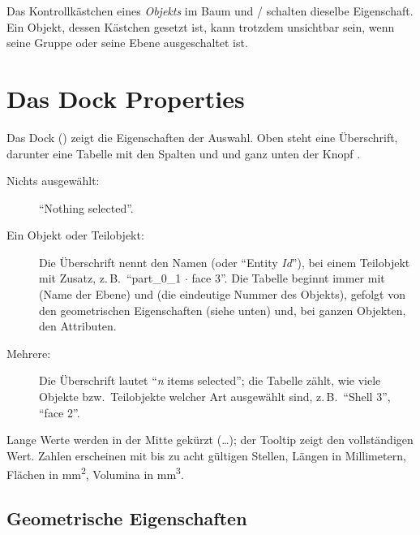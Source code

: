 \begin{hinweis}
Das Kontrollkästchen eines \emph{Objekts} im Baum und / schalten
dieselbe Eigenschaft. Ein Objekt, dessen Kästchen gesetzt ist, kann trotzdem unsichtbar sein,
wenn seine Gruppe oder seine Ebene ausgeschaltet ist.
\end{hinweis}

\section{Das Dock Properties}\label{sec:eigenschaften}

Das Dock  () zeigt die Eigenschaften der Auswahl. Oben
steht eine Überschrift, darunter eine Tabelle mit den Spalten  und 
und ganz unten der Knopf .

\begin{description}
  \item[Nichts ausgewählt:] \enquote{Nothing selected}.
  \item[Ein Objekt oder Teilobjekt:] Die Überschrift nennt den Namen (oder \enquote{Entity
    \textit{Id}}), bei einem Teilobjekt mit Zusatz, z.\,B.\ \enquote{part\_0\_1 $\cdot$ face 3}.
    Die Tabelle beginnt immer mit  (Name der Ebene) und  (die eindeutige
    Nummer des Objekts), gefolgt von den geometrischen Eigenschaften (siehe unten) und, bei
    ganzen Objekten, den Attributen.
  \item[Mehrere:] Die Überschrift lautet \enquote{\textit{n} items selected}; die Tabelle
    zählt, wie viele Objekte bzw.\ Teilobjekte welcher Art ausgewählt sind, z.\,B.\
    \enquote{Shell 3}, \enquote{face 2}.
\end{description}

Lange Werte werden in der Mitte gekürzt (\dots); der Tooltip zeigt den vollständigen Wert.
Zahlen erscheinen mit bis zu acht gültigen Stellen, Längen in Millimetern, Flächen in
\si{\milli\metre\squared}, Volumina in \si{\milli\metre\cubed}.

\subsection{Geometrische Eigenschaften}

